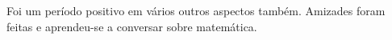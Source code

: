 \documentclass[
	12pt,				%
	openright,			%
	twoside,			%
	a4paper,			%
	english,			%
	french,				%
	spanish,			%
	brazil				%
	]{abntex2}
\begin{document}
Foi um período positivo em vários outros aspectos também. Amizades foram feitas e aprendeu-se a conversar sobre matemática. 

    \postextual
    
%
%





\printindex
\end{document}
